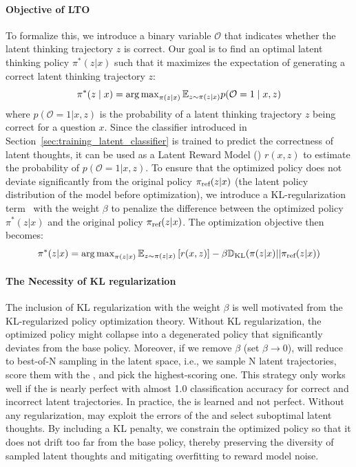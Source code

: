 \documentclass{article} %
\begin{document}
\paragraph*{Objective of LTO}
To formalize this, we introduce a binary variable $\mathcal{O}$ that indicates whether the latent thinking trajectory $z$ is correct. Our goal is to find an optimal latent thinking policy $\pi^{*}(z|x)$ such that it maximizes the expectation of generating a correct latent thinking trajectory $z$:
\begin{equation}
\pi^*(z \mid x) = \operatorname*{arg\,max}\nolimits_{\pi(z \mid x)} \mathbb{E}_{z \sim \pi(z \mid x)} p(\mathcal{O} = 1\mid x, z)
\end{equation}
where $p(\mathcal{O}=1|x, z)$ is the probability of a latent thinking trajectory $z$ being correct for a question $x$. Since the classifier introduced in Section~\ref{sec:training_latent_classifier} is trained to predict the correctness of latent thoughts, it can be used as a Latent Reward Model (\LRM) $r(x,z)$ to estimate the probability of $p(\mathcal{O}=1|x, z)$. To ensure that the optimized policy does not deviate significantly from the original policy $\pi_\text{ref}(z|x)$ (the latent policy distribution of the model before \LTO optimization), we introduce a KL-regularization term~\citep{jaques2017sequence,ziegler2019fine,rafailov2023direct} with the weight $\beta$ to penalize the difference between the optimized policy $\pi^{*}(z|x)$ and the original policy $\pi_\text{ref}(z|x)$. The optimization objective then becomes:
\begin{equation}
    \label{eqn:KL_constrained_reward_optimization}\pi^{*}(z|x)=\operatorname*{arg\,max}\nolimits_{\pi(z|x)}\mathbb{E}_{z\sim\pi(z|x)}\left[r(x,z)\right]-\beta\mathbb{D}_{\textrm{KL}}(\pi(z|x)||\pi_\text{ref}(z|x))
\end{equation}
\paragraph*{The Necessity of KL regularization}
The inclusion of KL regularization with the weight $\beta$ is well motivated from the KL-regularized policy optimization theory. Without KL regularization, the optimized policy might collapse into a degenerated policy that significantly deviates from the base policy. Moreover, if we remove $\beta$ (set $\beta{\rightarrow}0$), \LTO will reduce to best-of-N sampling in the latent space, i.e., we sample N latent trajectories, score them with the \LRM, and pick the highest-scoring one. This strategy only works well if the \LRM is nearly perfect with almost 1.0 classification accuracy for correct and incorrect latent trajectories. In practice, the \LRM is learned and not perfect. Without any regularization, \LTO may exploit the errors of the \LRM and select suboptimal latent thoughts. By including a KL penalty, we constrain the optimized policy so that it does not drift too far from the base policy, thereby preserving the diversity of sampled latent thoughts and mitigating overfitting to reward model noise.
\end{document}
